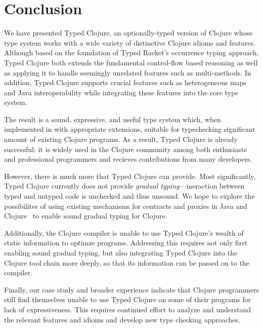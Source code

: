 \section{Conclusion}
\label{sec:conclusion}

We have presented Typed Clojure, an optionally-typed version of
Clojure whose type system works with a wide variety of distinctive
Clojure idioms and features. Although based on the foundation of Typed
Racket's occurrence typing approach, Typed Clojure both extends the
fundamental control-flow based reasoning as well as applying it to
handle seemingly unrelated features such as multi-methods. In
addition, Typed Clojure supports crucial features such as heterogeneous
maps and Java interoperability while integrating these features into
the core type system.

The result is a sound, expressive, and useful type system which, when
implemented in \coretyped with appropriate extensions, suitable for
typechecking significant amount of existing Clojure programs.
%
As a result, Typed Clojure is already successful: it is widely used in
the Clojure community among both enthusiasts and professional
programmers and recieves contributions from many developers.


However, there is much more that Typed Clojure can provide. Most
significantly, Typed Clojure currently does not provide \emph{gradual
  typing}---ineraction between typed and untyped code is unchecked and
thus unsound. We hope to explore the possibilites of using existing
mechanisms for contracts and proxies in Java and
Clojure~\cite{some-stuff} to enable sound gradual typing for Clojure.

Additionally, the Clojure compiler is unable to use Typed Clojure's
wealth of static information to optimze programs. Addressing this
requires not only first enabling sound gradual typing, but also
integrating Typed Clojure into the Clojure tool chain more deeply, so
that its information can be passed on to the compiler. 

Finally, our case study and broader experience indicate that Clojure
programmers still find themselves unable to use Typed Clojure on some
of their programs for lack of expressiveness. This requires continued
effort to analyze and understand the relevant features and idioms and
develop new type checking approaches.
